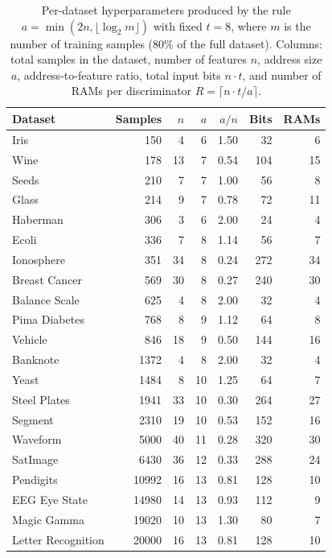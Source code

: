 \documentclass[runningheads]{llncs}
\begin{document}
\begin{table}[!tbp]
  \centering
  \caption{Per-dataset hyperparameters produced by the rule $a = \min(2n, \lfloor \log_2 m \rfloor)$ with fixed $t = 8$, where $m$ is the number of training samples (80\% of the full dataset). Columns: total samples in the dataset, number of features $n$, address size $a$, address-to-feature ratio, total input bits $n \cdot t$, and number of RAMs per discriminator $R = \lceil n \cdot t / a \rceil$.}
  \label{tab:configs}
  \scriptsize
  \setlength{\tabcolsep}{3pt}
  \begin{tabular}{lrrrrrr}
    \toprule
    Dataset & Samples & $n$ & $a$ & $a/n$ & Bits & RAMs \\
    \midrule
    Iris                 & 150   & 4  & 6  & 1.50 & 32  & 6 \\
    Wine                 & 178   & 13 & 7  & 0.54 & 104 & 15 \\
    Seeds                & 210   & 7  & 7  & 1.00 & 56  & 8 \\
    Glass                & 214   & 9  & 7  & 0.78 & 72  & 11 \\
    Haberman             & 306   & 3  & 6  & 2.00 & 24  & 4 \\
    Ecoli                & 336   & 7  & 8  & 1.14 & 56  & 7 \\
    Ionosphere           & 351   & 34 & 8  & 0.24 & 272 & 34 \\
    Breast Cancer        & 569   & 30 & 8  & 0.27 & 240 & 30 \\
    Balance Scale        & 625   & 4  & 8  & 2.00 & 32  & 4 \\
    Pima Diabetes        & 768   & 8  & 9  & 1.12 & 64  & 8 \\
    Vehicle              & 846   & 18 & 9  & 0.50 & 144 & 16 \\
    Banknote             & 1372  & 4  & 8  & 2.00 & 32  & 4 \\
    Yeast                & 1484  & 8  & 10 & 1.25 & 64  & 7 \\
    Steel Plates         & 1941  & 33 & 10 & 0.30 & 264 & 27 \\
    Segment              & 2310  & 19 & 10 & 0.53 & 152 & 16 \\
    Waveform             & 5000  & 40 & 11 & 0.28 & 320 & 30 \\
    SatImage             & 6430  & 36 & 12 & 0.33 & 288 & 24 \\
    Pendigits            & 10992 & 16 & 13 & 0.81 & 128 & 10 \\
    EEG Eye State        & 14980 & 14 & 13 & 0.93 & 112 & 9 \\
    Magic Gamma          & 19020 & 10 & 13 & 1.30 & 80  & 7 \\
    Letter Recognition   & 20000 & 16 & 13 & 0.81 & 128 & 10 \\
    \bottomrule
  \end{tabular}
\end{table}
\end{document}
